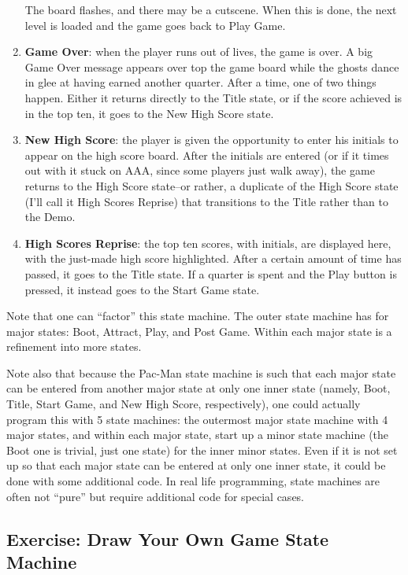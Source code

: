 \begin{enumerate}
  The board flashes, and there may be a cutscene. When this is done, the
  next level is loaded and the game goes back to Play Game.
\item
  \textbf{Game Over}: when the player runs out of lives, the game is
  over. A big Game Over message appears over top the game board while
  the ghosts dance in glee at having earned another quarter. After a
  time, one of two things happen. Either it returns directly to the
  Title state, or if the score achieved is in the top ten, it goes to
  the New High Score state.
\item
  \textbf{New High Score}: the player is given the opportunity to enter
  his initials to appear on the high score board. After the initials are
  entered (or if it times out with it stuck on AAA, since some players
  just walk away), the game returns to the High Score state--or rather,
  a duplicate of the High Score state (I'll call it High Scores Reprise)
  that transitions to the Title rather than to the Demo.
\item
  \textbf{High Scores Reprise}: the top ten scores, with initials, are
  displayed here, with the just-made high score highlighted. After a
  certain amount of time has passed, it goes to the Title state. If a
  quarter is spent and the Play button is pressed, it instead goes to
  the Start Game state.
\end{enumerate}

Note that one can ``factor'' this state machine. The outer state machine
has for major states: Boot, Attract, Play, and Post Game. Within each
major state is a refinement into more states.

Note also that because the Pac-Man state machine is such that each major
state can be entered from another major state at only one inner state
(namely, Boot, Title, Start Game, and New High Score, respectively), one
could actually program this with 5 state machines: the outermost major
state machine with 4 major states, and within each major state, start up
a minor state machine (the Boot one is trivial, just one state) for the
inner minor states. Even if it is not set up so that each major state
can be entered at only one inner state, it could be done with some
additional code. In real life programming, state machines are often not
``pure'' but require additional code for special cases.

\subsection[Exercise: Draw Your Own Game State
Machine]{\texorpdfstring{\protect\hypertarget{anchor-9}{}{}Exercise:
Draw Your Own Game State
Machine}{Exercise: Draw Your Own Game State Machine}}\label{exercise-draw-your-own-game-state-machine}

